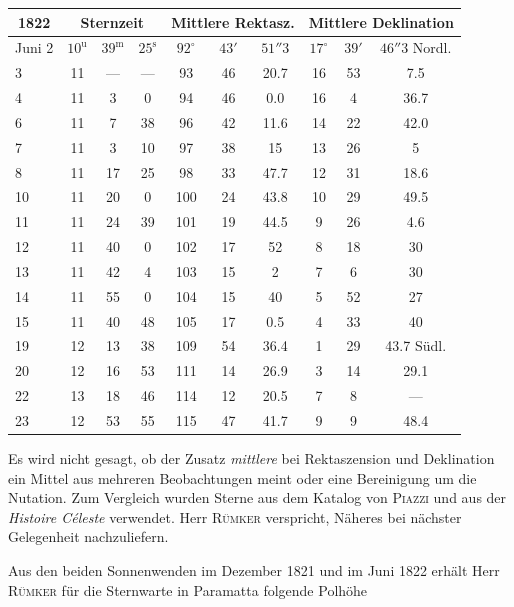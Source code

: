 \begin{center}
\small\setlength{\tabcolsep}{3pt}
\begin{tabular}{l|ccc|ccc|ccc}
\multicolumn{1}{c|}{1822} & \multicolumn{3}{c|}{Sternzeit} & \multicolumn{3}{c|}{Mittlere Rektasz.} & \multicolumn{3}{c}{Mittlere Deklination} \\
\hline
Juni 2 & $10^{\mathrm{u}}$ & $39^{\mathrm{m}}$ & $25^{\mathrm{s}}$ & $92^{\circ}$ & $43'$ & $51''3$ & $17^{\circ}$ & $39'$ & $46''3$ Nordl. \\
3 & 11 & --- & --- & 93 & 46 & 20.7 & 16 & 53 & 7.5 \\
4 & 11 & 3 & 0 & 94 & 46 & 0.0 & 16 & 4 & 36.7 \\
6 & 11 & 7 & 38 & 96 & 42 & 11.6 & 14 & 22 & 42.0 \\
7 & 11 & 3 & 10 & 97 & 38 & 15 & 13 & 26 & 5 \\
8 & 11 & 17 & 25 & 98 & 33 & 47.7 & 12 & 31 & 18.6 \\
10 & 11 & 20 & 0 & 100 & 24 & 43.8 & 10 & 29 & 49.5 \\
11 & 11 & 24 & 39 & 101 & 19 & 44.5 & 9 & 26 & 4.6 \\
12 & 11 & 40 & 0 & 102 & 17 & 52 & 8 & 18 & 30 \\
13 & 11 & 42 & 4 & 103 & 15 & 2 & 7 & 6 & 30 \\
14 & 11 & 55 & 0 & 104 & 15 & 40 & 5 & 52 & 27 \\
15 & 11 & 40 & 48 & 105 & 17 & 0.5 & 4 & 33 & 40 \\
19 & 12 & 13 & 38 & 109 & 54 & 36.4 & 1 & 29 & 43.7 Südl. \\
20 & 12 & 16 & 53 & 111 & 14 & 26.9 & 3 & 14 & 29.1 \\
22 & 13 & 18 & 46 & 114 & 12 & 20.5 & 7 & 8 & --- \\
23 & 12 & 53 & 55 & 115 & 47 & 41.7 & 9 & 9 & 48.4 \\
\end{tabular}
\end{center}

Es wird nicht gesagt, ob der Zusatz \emph{mittlere} bei Rektaszension und Deklination ein Mittel aus mehreren Beobachtungen meint oder eine Bereinigung um die Nutation. Zum Vergleich wurden Sterne aus dem Katalog von \textsc{Piazzi} und aus der \emph{Histoire Céleste} verwendet. Herr \textsc{Rümker} verspricht, Näheres bei nächster Gelegenheit nachzuliefern.

Aus den beiden Sonnenwenden im Dezember 1821 und im Juni 1822 erhält Herr \textsc{Rümker} für die Sternwarte in Paramatta folgende Polhöhe

